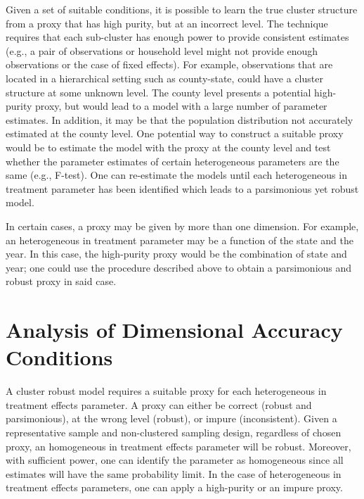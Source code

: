 \documentclass{jbsc}
\begin{document}
Given a set of suitable conditions, it is possible to learn the true cluster structure from a proxy that has high purity, but at an incorrect level. The technique requires that each sub-cluster has enough power to provide consistent estimates (e.g., a pair of observations or household level might not provide enough observations or the case of fixed effects). For example, observations that are located in a hierarchical setting such as county-state, could have a cluster structure at some unknown level. The county level presents a potential high-purity proxy, but would lead to a model with a large number of parameter estimates. In addition, it may be that the population distribution not accurately estimated at the county level. One potential way to construct a suitable proxy would be to estimate the model with the proxy at the county level and test whether the parameter estimates of certain heterogeneous parameters are the same (e.g., F-test). One can re-estimate the models until each heterogeneous in treatment parameter has been identified which leads to a parsimonious yet robust model.

In certain cases, a proxy may be given by more than one dimension. For example, an heterogeneous in treatment parameter may be a function of the state and the year. In this case, the high-purity proxy would be the combination of state and year; one could use the procedure described above to obtain a parsimonious and robust proxy in said case.

\FloatBarrier
\section{Analysis of Dimensional Accuracy Conditions}

A cluster robust model requires a suitable proxy for each heterogeneous in treatment effects parameter. A proxy can either be correct (robust and parsimonious), at the wrong level (robust), or impure (inconsistent). Given a representative sample and non-clustered sampling design, regardless of chosen proxy, an homogeneous in treatment effects parameter will be robust. Moreover, with sufficient power, one can identify the parameter as homogeneous since all estimates will have the same probability limit. In the case of heterogeneous in treatment effects parameters, one can apply a high-purity or an impure proxy.
\end{document}
